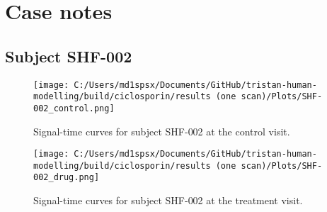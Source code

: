 \documentclass{epflreport}%
\begin{document}
\section{Case notes}%
\label{sec:Casenotes}%

%
\subsection{Subject SHF{-}002}%
\label{subsec:SubjectSHF{-}002}%

%


\begin{figure}[h!]%
\centering%
\texttt{[image: C:/Users/md1spsx/Documents/GitHub/tristan-human-modelling/build/ciclosporin/results (one scan)/Plots/SHF-002\_control.png]}%
\caption{Signal{-}time curves for subject SHF{-}002 at the control visit.}%
\end{figure}

%


\begin{figure}[h!]%
\centering%
\texttt{[image: C:/Users/md1spsx/Documents/GitHub/tristan-human-modelling/build/ciclosporin/results (one scan)/Plots/SHF-002\_drug.png]}%
\caption{Signal{-}time curves for subject SHF{-}002 at the treatment visit.}%
\end{figure}
\end{document}
